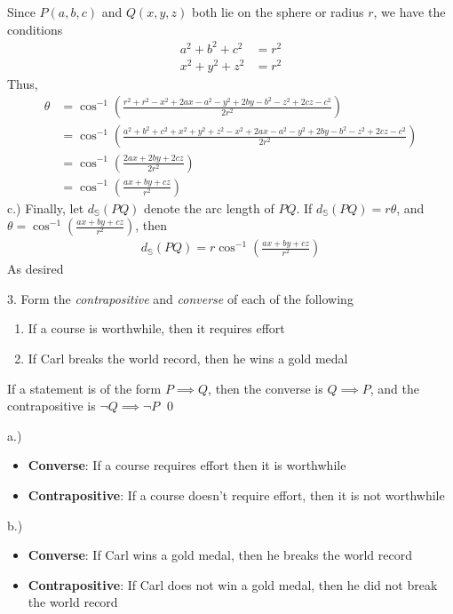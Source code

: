 \documentclass{report}
\begin{document}
    Since $P(a,b,c)$ and $Q(x,y,z)$ both lie on the sphere or radius $r$, we have the conditions
    \begin{align*}
        a^{2} + b^{2} + c^{2} &= r^{2} \\
        x^{2} + y^{2} + z^{2} &=r^{2}
    \end{align*}
    Thus,
    \begin{align*}
       \theta  &= \cos^{-1}{\left(\frac{r^{2} + r^{2} -x^{2} + 2ax - a^{2}  -y^{2} +2by -b^{2} -z^{2} + 2cz - c^{2}}{2r^{2}}\right)} \\
               &= \cos^{-1}{\left(\frac{a^{2} + b^{2} +c^{2} + x^{2} + y^{2} + z^{2} -x^{2} + 2ax - a^{2}  -y^{2} +2by -b^{2} -z^{2} + 2cz - c^{2}}{2r^{2}}\right)} \\
               &= \cos^{-1}{\left(\frac{2ax + 2by + 2cz}{2r^{2}}\right)} \\
               &= \cos^{-1}{\left(\frac{ax+by+cz}{r^{2}}\right)}
    \end{align*}
    c.) Finally, let $d_{\mathbb{S}}(PQ)$ denote the arc length of $PQ $. If $d_{\mathbb{S}}(PQ) = r\theta$, and $\theta  = \cos^{-1}{\left(\frac{ax+by+cz}{r^{2}}\right)} $, then
    \begin{align*}
        d_{\mathbb{S}}(PQ) = r\cos^{-1}{\left(\frac{ax+by+cz}{r^{2}}\right)}
    \end{align*}
    As desired \endpf

    \bigbreak \noindent 
    \begin{mdframed}
        3.  Form the \textit{contrapositive} and \textit{converse} of each of the following
        \begin{enumerate}[label=(\alph*)]
            \item If a course is worthwhile, then it requires effort
            \item If Carl breaks the world record, then he wins a gold medal
        \end{enumerate}
    \end{mdframed}
    \bigbreak \noindent 
    \begin{remark}
        If a statement is of the form $P\implies Q$, then the converse is $Q\implies P$, and the contrapositive is $\neg Q \implies \neg P $
        \qed
    \end{remark}
    \bigbreak \noindent 
    a.) 
    \begin{itemize}
        \item \textbf{Converse}: If a course requires effort then it is worthwhile
        \item \textbf{Contrapositive}: If a course doesn't require effort, then it is not worthwhile
    \end{itemize}
    \bigbreak \noindent 
    b.)
    \begin{itemize}
        \item \textbf{Converse}: If Carl wins a gold medal, then he breaks the world record
        \item \textbf{Contrapositive}: If Carl does not win a gold medal, then he did not break the world record
    \end{itemize}
\end{document}

